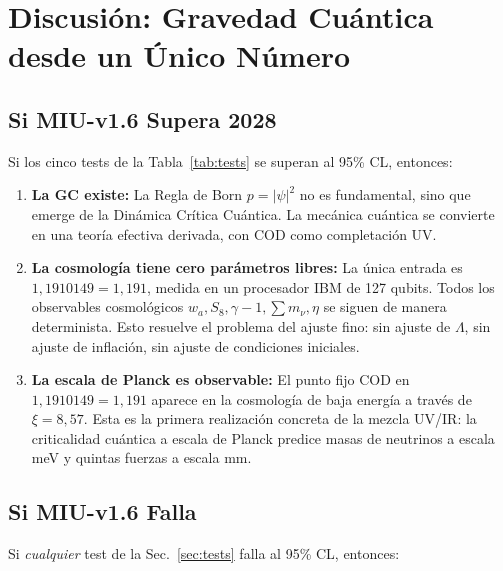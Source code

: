 \documentclass[12pt, a4paper]{article}
\theoremstyle{miuThm}
\theoremstyle{remark}
\newcommand{\qborn}{1{,}1910149}
\begin{document}
\section{Discusión: Gravedad Cuántica desde un Único Número}
\label{sec:discussion}

\subsection{Si MIU-v1.6 Supera 2028}
Si los cinco tests de la Tabla~\ref{tab:tests} se superan al 95\% CL, entonces:

\begin{enumerate}
\item \textbf{La GC existe:} La Regla de Born $p = |\psi|^2$ no es fundamental,
sino que emerge de la Dinámica Crítica Cuántica. La mecánica cuántica se convierte
en una teoría efectiva derivada, con COD como completación UV.

\item \textbf{La cosmología tiene cero parámetros libres:} La única entrada es
$\qborn = 1{,}191$, medida en un procesador IBM de 127 qubits. Todos los
observables cosmológicos $w_a, S_8, \gamma-1, \sum m_\nu, \eta$ se siguen de
manera determinista. Esto resuelve el problema del ajuste fino: sin ajuste de
$\Lambda$, sin ajuste de inflación, sin ajuste de condiciones iniciales.

\item \textbf{La escala de Planck es observable:} El punto fijo COD en $\qborn = 1{,}191$
aparece en la cosmología de baja energía a través de $\xi = 8{,}57$. Esta es la
primera realización concreta de la mezcla UV/IR: la criticalidad cuántica a escala
de Planck predice masas de neutrinos a escala meV y quintas fuerzas a escala mm.
\end{enumerate}

\subsection{Si MIU-v1.6 Falla}
Si \textit{cualquier} test de la Sec.~\ref{sec:tests} falla al 95\% CL, entonces:
\end{document}
